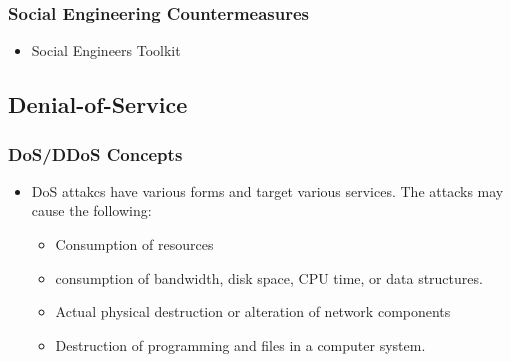 \subsubsection{Social Engineering Countermeasures}
\begin{itemize}
    \item Social Engineers Toolkit
\end{itemize}


\subsection{Denial-of-Service}
\subsubsection{DoS/DDoS Concepts}
\begin{itemize}
    \item DoS attakcs have various forms and target various services. The attacks may cause the following:
    \begin{itemize}
        \item Consumption of resources
        \item consumption of bandwidth, disk space, CPU time, or data structures.
        \item Actual physical destruction or alteration of network components
        \item Destruction of programming and files in a computer system.
    \end{itemize}
\end{itemize}
